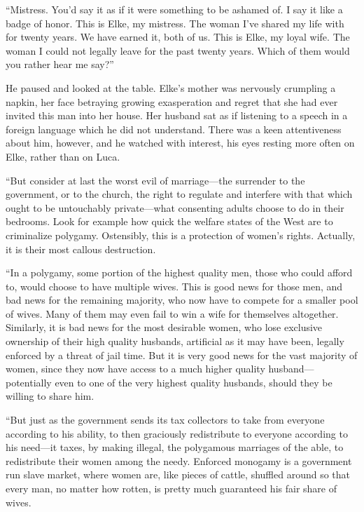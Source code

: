 ``Mistress. You'd say it as if it were something to be ashamed of. I say it like a badge of honor. This is Elke, my mistress. The woman I've shared my life with for twenty years. We have earned it, both of us. This is Elke, my loyal wife. The woman I could not legally leave for the past twenty years. Which of them would you rather hear me say?''

He paused and looked at the table. Elke's mother was nervously crumpling a napkin, her face betraying growing exasperation and regret that she had ever invited this man into her house. Her husband sat as if listening to a speech in a foreign language which he did not understand. There was a keen attentiveness about him, however, and he watched with interest, his eyes resting more often on Elke, rather than on Luca.

``But consider at last the worst evil of marriage---the surrender to the government, or to the church, the right to regulate and interfere with that which ought to be untouchably private---what consenting adults choose to do in their bedrooms. Look for example how quick the welfare states of the West are to criminalize polygamy. Ostensibly, this is a protection of women's rights. Actually, it is their most callous destruction.

``In a polygamy, some portion of the highest quality men, those who could afford to, would choose to have multiple wives. This is good news for those men, and bad news for the remaining majority, who now have to compete for a smaller pool of wives. Many of them may even fail to win a wife for themselves altogether. Similarly, it is bad news for the most desirable women, who lose exclusive ownership of their high quality husbands, artificial as it may have been, legally enforced by a threat of jail time. But it is very good news for the vast majority of women, since they now have access to a much higher quality husband---potentially even to one of the very highest quality husbands, should they be willing to share him.

``But just as the government sends its tax collectors to take from everyone according to his ability, to then graciously redistribute to everyone according to his need---it taxes, by making illegal, the polygamous marriages of the able, to redistribute their women among the needy. Enforced monogamy is a government run slave market, where women are, like pieces of cattle, shuffled around so that every man, no matter how rotten, is pretty much guaranteed his fair share of wives.

